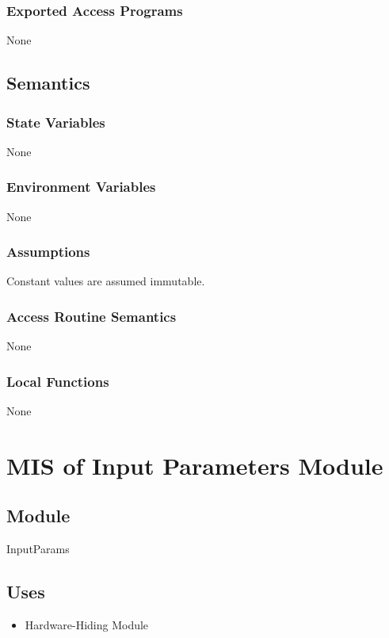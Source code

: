\documentclass[12pt, titlepage]{article}
\begin{document}
\subsubsection{Exported Access Programs}
None 

\subsection{Semantics}

\subsubsection{State Variables}
None

\subsubsection{Environment Variables}
None

\subsubsection{Assumptions}
Constant values are assumed immutable. 

\subsubsection{Access Routine Semantics}
None

\subsubsection{Local Functions}
None



\section{MIS of Input Parameters Module} \label{MISInpParam}

\subsection{Module}
InputParams 

\subsection{Uses}
\begin{itemize}
  \item Hardware-Hiding Module
\end{itemize}
\end{document}
